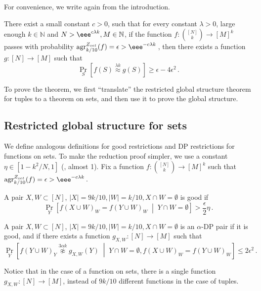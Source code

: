 \documentclass{toc}
\newcommand{\Prob}[2][]{\Pr_{{#1}}\left[#2\right]} %
\newcommand{\abs}[1]{\lvert#1\rvert} %
\newcommand{\given}{\;\middle\vert\;} %
\newcommand\f{f} %
\newcommand\setf{f} %
\newcommand{\g}{g} %
\newcommand{\test}[2]{
	\ifx &#2&
	\textrm{agr}^{#1}
	\else	
	\textrm{agr}^{#1}_{#2}
	\fi}
\newcommand\neql[1]{\stackrel{{#1}}{ \approx}} %
\newcommand\neqg[1]{\stackrel{{#1}}{ \not\approx}} %
\newcommand{\sets}{\binom{[N]}{k}} %
\begin{document}
For convenience, we write again  from the introduction.
\begin{theorem}
	There exist a small constant $c>0$, such that for every constant $\lambda>0$, large enough $k\in\mathbb{N}$ and $N > \eee^{c\lambda k},M\in\mathbb{N}$, if the function $\setf:\sets\rightarrow[M]^k$ passes  with probability $\test{Z_{set}}{k/10}(\f)=\epsilon > \eee^{-c\lambda k}$\,, then there exists a function $\g:[N]\rightarrow[M]$ such that
	\[ \Prob[S]{\setf(S)\neql{\lambda k}\g(S)} \geq \epsilon - 4\epsilon^2 \,.\]%
\end{theorem}

To prove the theorem, we first  ``translate'' the restricted global structure theorem for tuples to a theorem on sets, and then use it to prove the global structure.
\subsection{Restricted global structure for sets}
We define analogous definitions for good restrictions and DP restrictions for functions on sets. To make the reduction proof simpler, we use a constant
$\eta\in\left[1- k^2/N, 1\right]$ (\ie, almost 1). Fix a function $\f:\binom{[N]}{k}\rightarrow [M]^k$ such that $\test{Z_{set}}{k/10}(\f)=\epsilon > \eee^{-c\lambda k}$\,.

\begin{definition}
	A pair $X,W\subset[N]$, $\abs{X}=9k/10,\abs{W}=k/10, X\cap W=\emptyset$ is good if \[\Prob[Y]{\f(X\cup W)_W = \f(Y\cup W)_W\given  Y\cap W=\emptyset} > \frac{\epsilon}{2}\eta\,.\]%
\end{definition}

\begin{definition}
	A pair $X,W\subset[N]$, $\abs{X}=9k/10,\abs{W}=k/10, X\cap W=\emptyset$ is an $\alpha$-DP pair if it is good, and if there exists a function $\g_{X,W}:[N]\rightarrow[M]$ such that
	\[	\Prob[Y]{\f(Y\cup W)_Y \neqg{3\alpha k} \g_{X,W}(Y)\given Y\cap W=\emptyset, \f(X\cup W)_W = \f(Y\cup W)_W} \leq 2\epsilon^{2 }\,.\]%
\end{definition}
Notice that in the case of a function on sets, there is a single function $\g_{X,W}:[N]\rightarrow[M]$, instead of $9k/10$ different functions in the case of tuples. 
\end{document}
